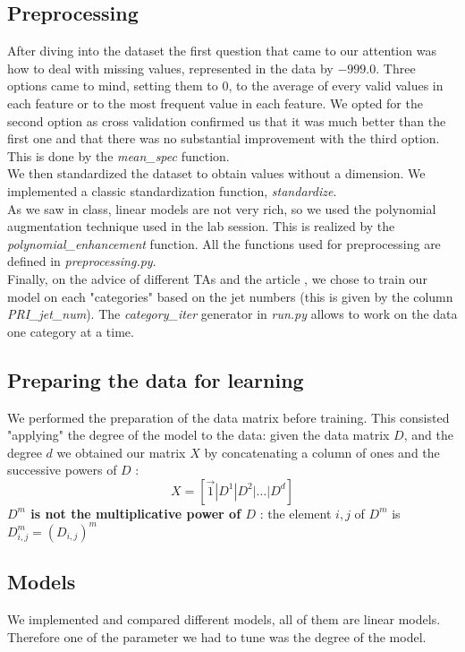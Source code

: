 \documentclass[10pt,conference,compsocconf]{IEEEtran}
\begin{document}
\subsection{Preprocessing}
After diving into the dataset the first question that came to our attention was how to deal with missing values, represented in the data by $-999.0$. Three options came to mind, setting them to $0$, to the average of every valid values in each feature or to the most frequent value in each feature. We opted for the second option as cross validation confirmed us that it was much better than the first one and that there was no substantial improvement with the third option. This is done by the \textit{mean\_spec} function.\\
We then standardized the dataset to obtain values without a dimension. We implemented a classic standardization function, \textit{standardize}.\\ As we saw in class, linear models are not very rich, so we used the polynomial augmentation technique used in the lab session. This is realized by the \textit{polynomial\_enhancement} function. All the functions used for preprocessing are defined in \textit{preprocessing.py}.\\
Finally, on the advice of different TAs and the article \cite{anderson04}, we chose to train our model on each "categories" based on the jet numbers (this is given by the column \textit{PRI\_jet\_num}). The \textit{category\_iter} generator in \textit{run.py} allows to work on the data one category at a time.

\subsection{Preparing the data for learning}
We performed the preparation of the data matrix before training. This consisted "applying" the degree of the model to the data: given the data matrix $D$, and the degree $d$ we obtained our matrix $X$ by concatenating a column of ones and the successive powers of $D$ : $$X = \left[\vec{1} | D^1 | D^2 | \dots | D^d\right]$$
\textbf{$D^m$ is not the multiplicative power of $D$ }: the element $i,j$ of $D^m$ is $D^m_{i,j}= (D_{i,j})^m$

\subsection{Models}
We implemented and compared different models, all of them are linear models. Therefore one of the parameter we had to tune was the degree of the model.
\end{document}
